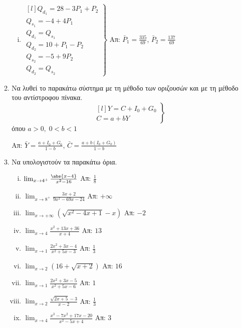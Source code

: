 \begin{enumerate}
\begin{enumerate}[i)]
      \item 
        $ 
        \left.
          \begin{matrix*}[l]
            Q_{d_{1}}=28-3P_{1}+P_{2} \\
            Q_{s_{1}}=-4+4P_{1} \\
            Q_{d_{1}}=Q_{s_{1}} \\
            Q_{d_{2}}=10+P_{1}-P_{2} \\
            Q_{s_{2}}=-5+9P_{2} \\
            Q_{d_{2}}=Q_{s_{2}}
          \end{matrix*} 
        \right\}$
        \hfill Απ: $ \bar{P}_{1} = \frac{335}{69} $, $ \bar{P}_{2} = \frac{137}{69} $  
    \end{enumerate}

  \item Να λυθεί το παρακάτω σύστημα με τη μέθοδο των οριζουσών και με τη μέθοδο 
    του αντίστροφου πίνακα.
    \[
      \left.
        \begin{matrix*}[l]
          Y=C+I_{0}+G_{0} \\
          C=a+bY
        \end{matrix*} 
      \right\}
    \]
    όπου $ a>0,\; 0<b<1 $

    \hfill Απ: $ \bar{Y} = \frac{a + I_{0}+G_{0}}{1-b} $, 
    $ \bar{C} = \frac{a + b(I_{0}+G_{0})}{1-b} $  

  \item Να υπολογιστούν τα παρακάτω όρια.

    \begin{enumerate}[i)]
      \item $ \lim_{x\to 4^{+}} \frac{\abs{x-4}}{x^{2}-16} $ \hfill Απ: $ \frac{1}{8} $
      \item $ \lim_{x\to 8^{+}} \frac{3x+2}{9x^{2}-69x-24} $ \hfill Απ: $ +\infty $
      \item $ \lim_{x\to +\infty} (\sqrt{x^{2}-4x+1} - x) $ \hfill Απ: $ -2 $ 
      \item $ \lim_{x\to 4} \frac{x^{2}+13x+36}{x+4} $ \hfill Απ: $ 13 $
      \item $ \lim_{x\to 1} \frac{2x^{2}+3x-4}{x^{2}+5x-3} $ \hfill Απ: $ \frac{1}{3} $
      \item $ \lim_{x\to 2} (16+ \sqrt{x+2}) $ \hfill Απ: $ 16 $
      \item $ \lim_{x\to 1} \frac{2x^{2}+3x-5}{x^{2}+5x-6} $ \hfill Απ: $ 1 $
      \item $ \lim_{x\to 2} \frac{\sqrt{2x+5} - 3}{x-2} $ \hfill Απ: $ \frac{1}{3} $
      \item $ \lim_{x\to 4} \frac{x^{3}-7x^{2}+17x-20}{x^{2}-5x+4} $ \hfill Απ: $ 3 $ 
    \end{enumerate}


\end{enumerate}
